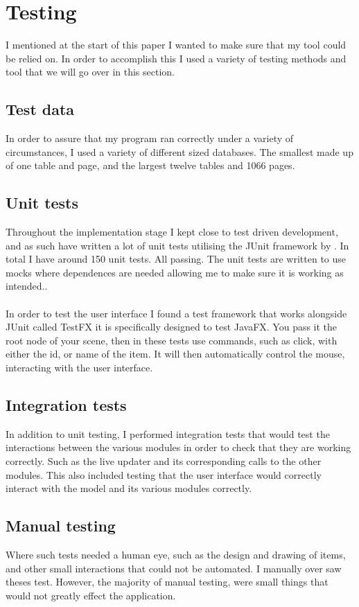 \section{Testing}
\label{sec:testing}

 I mentioned at the start of this paper I wanted to make sure that my tool could be relied on. In order to accomplish this I used a variety of testing methods and tool that we will go over in this section.

\subsection{Test data}
\label{subsec:test_data}

In order to assure that my program ran correctly under a variety of circumstances, I used a variety of different sized databases. The smallest made up of one table and page, and the largest twelve tables and 1066 pages. 

\subsection{Unit tests}
\label{subsec:unit_tests}

Throughout the implementation stage I kept close to test driven development, and as such have written a lot of unit tests utilising the JUnit framework by \cite{junit} . In total I have around 150 unit tests. All passing. The unit tests are written to use mocks where dependences are needed allowing me to make sure it is working as intended..
\\\\
In order to test the user interface I found a test framework that works alongside JUnit called TestFX \citep{test_fx} it is specifically designed to test JavaFX. You pass it the root node of your scene, then in these tests use commands, such as click, with either the id, or name of the item. It will then automatically control the mouse, interacting with the user interface.

\subsection{Integration tests}
\label{subsec:integration_tests}

In addition to unit testing, I performed integration tests that would test the interactions between the various modules in order to check that they are working correctly. Such as the live updater and its corresponding calls to the other modules. This also included testing that the user interface would correctly interact with the model and its various modules correctly.

\subsection{Manual testing}
\label{subsec:mamual_tests}

Where such tests needed a human eye, such as the design and drawing of items, and other small interactions that could not be automated. I manually over saw theses test. However, the majority of manual testing, were small things that would not greatly effect the application.
